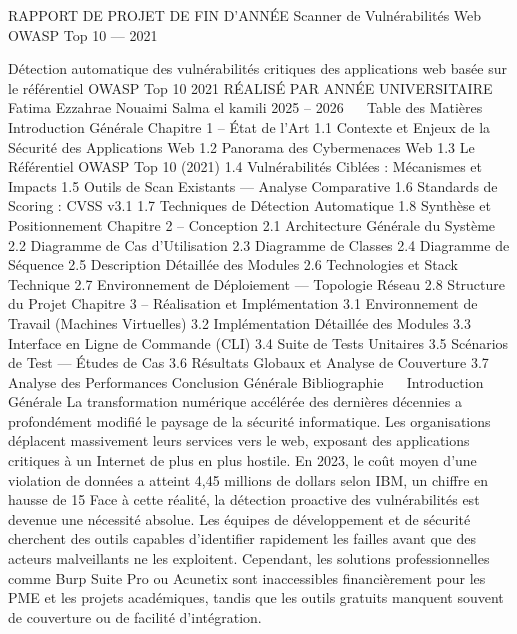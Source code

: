  

RAPPORT DE PROJET DE FIN D’ANNÉE
Scanner de Vulnérabilités Web
OWASP Top 10 — 2021

Détection automatique des vulnérabilités critiques des applications web
basée sur le référentiel OWASP Top 10 2021
RÉALISÉ PAR	ANNÉE UNIVERSITAIRE
Fatima Ezzahrae Nouaimi
Salma el kamili                                                                                                   2025 – 2026
 
Table des Matières
Introduction Générale
Chapitre 1 – État de l'Art
  1.1  Contexte et Enjeux de la Sécurité des Applications Web
  1.2  Panorama des Cybermenaces Web
  1.3  Le Référentiel OWASP Top 10 (2021)
  1.4  Vulnérabilités Ciblées : Mécanismes et Impacts
  1.5  Outils de Scan Existants — Analyse Comparative
  1.6  Standards de Scoring : CVSS v3.1
  1.7  Techniques de Détection Automatique
  1.8  Synthèse et Positionnement
Chapitre 2 – Conception
  2.1  Architecture Générale du Système
  2.2  Diagramme de Cas d'Utilisation
  2.3  Diagramme de Classes
  2.4  Diagramme de Séquence
  2.5  Description Détaillée des Modules
  2.6  Technologies et Stack Technique
  2.7  Environnement de Déploiement — Topologie Réseau
  2.8  Structure du Projet
Chapitre 3 – Réalisation et Implémentation
  3.1  Environnement de Travail (Machines Virtuelles)
  3.2  Implémentation Détaillée des Modules
  3.3  Interface en Ligne de Commande (CLI)
  3.4  Suite de Tests Unitaires
  3.5  Scénarios de Test — Études de Cas
  3.6  Résultats Globaux et Analyse de Couverture
  3.7  Analyse des Performances
Conclusion Générale
Bibliographie
 
Introduction Générale
La transformation numérique accélérée des dernières décennies a profondément modifié le paysage de la sécurité informatique. Les organisations déplacent massivement leurs services vers le web, exposant des applications critiques à un Internet de plus en plus hostile. En 2023, le coût moyen d'une violation de données a atteint 4,45 millions de dollars selon IBM, un chiffre en hausse de 15 %
Face à cette réalité, la détection proactive des vulnérabilités est devenue une nécessité absolue. Les équipes de développement et de sécurité cherchent des outils capables d'identifier rapidement les failles avant que des acteurs malveillants ne les exploitent. Cependant, les solutions professionnelles comme Burp Suite Pro ou Acunetix sont inaccessibles financièrement pour les PME et les projets académiques, tandis que les outils gratuits manquent souvent de couverture ou de facilité d'intégration.
